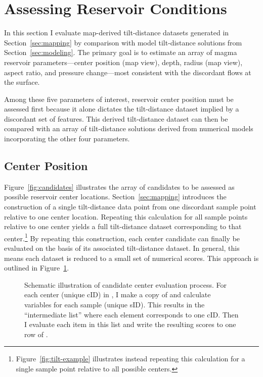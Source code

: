 \section{Assessing Reservoir Conditions}\label{sec:evaluation}

In this section I evaluate map-derived tilt-distance datasets generated in Section~\ref{sec:mapping} by comparison with model tilt-distance solutions from Section~\ref{sec:modeling}. The primary goal is to estimate an array of magma reservoir parameters---center position (map view), depth, radius (map view), aspect ratio, and pressure change---most consistent with the discordant flows at the surface. 

Among these five parameters of interest, reservoir center position must be assessed first because it alone dictates the tilt-distance dataset implied by a discordant set of features. This derived tilt-distance dataset can then be compared with an array of tilt-distance solutions derived from numerical models incorporating the other four parameters.

\subsection{Center Position}\label{sec:center-location}

Figure~\ref{fig:candidates} illustrates the array of candidates to be assessed as possible reservoir center locations. Section~\ref{sec:mapping} introduces the construction of a single tilt-distance data point from one discordant sample point relative to one center location. Repeating this calculation for all sample points relative to one center yields a full tilt-distance dataset corresponding to that center.\footnote{Figure~\ref{fig:tilt-example} illustrates instead repeating this calculation for a single sample point relative to all possible centers.} By repeating this construction, each center candidate can finally be evaluated on the basis of its associated tilt-distance dataset. In general, this means each dataset is reduced to a small set of numerical scores. This approach is outlined in Figure~\ref{fig:eval-model}.

\begin{figure}
    \caption[Center evaluation workflow]{Schematic illustration of candidate center evaluation process. For each center (unique cID) in , I make a copy of  and calculate variables for each sample (unique sID). This results in the ``intermediate list'' where each element corresponds to one cID. Then I evaluate each item in this list and write the resulting scores to one row of .}%
    \label{fig:eval-model}
\end{figure}

